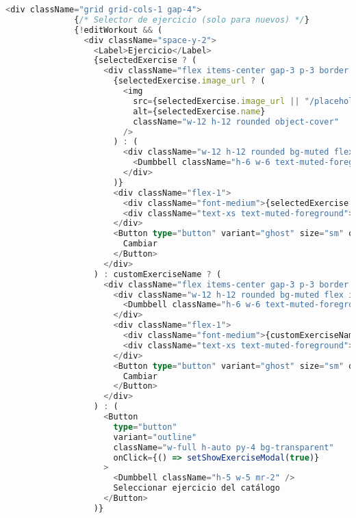 \documentclass[12pt,a4paper]{article}
\begin{document}
\begin{lstlisting}[language=typescript, caption=components/gym/workout-form.tsx - Estructura principal]
            <div className="grid grid-cols-1 gap-4">
              {/* Selector de ejercicio (solo para nuevos) */}
              {!editWorkout && (
                <div className="space-y-2">
                  <Label>Ejercicio</Label>
                  {selectedExercise ? (
                    <div className="flex items-center gap-3 p-3 border rounded-lg bg-accent/50">
                      {selectedExercise.image_url ? (
                        <img
                          src={selectedExercise.image_url || "/placeholder.svg"}
                          alt={selectedExercise.name}
                          className="w-12 h-12 rounded object-cover"
                        />
                      ) : (
                        <div className="w-12 h-12 rounded bg-muted flex items-center justify-center">
                          <Dumbbell className="h-6 w-6 text-muted-foreground" />
                        </div>
                      )}
                      <div className="flex-1">
                        <div className="font-medium">{selectedExercise.name}</div>
                        <div className="text-xs text-muted-foreground">{selectedExercise.category}</div>
                      </div>
                      <Button type="button" variant="ghost" size="sm" onClick={() => setShowExerciseModal(true)}>
                        Cambiar
                      </Button>
                    </div>
                  ) : customExerciseName ? (
                    <div className="flex items-center gap-3 p-3 border rounded-lg bg-accent/50">
                      <div className="w-12 h-12 rounded bg-muted flex items-center justify-center">
                        <Dumbbell className="h-6 w-6 text-muted-foreground" />
                      </div>
                      <div className="flex-1">
                        <div className="font-medium">{customExerciseName}</div>
                        <div className="text-xs text-muted-foreground">Ejercicio personalizado</div>
                      </div>
                      <Button type="button" variant="ghost" size="sm" onClick={() => setShowExerciseModal(true)}>
                        Cambiar
                      </Button>
                    </div>
                  ) : (
                    <Button
                      type="button"
                      variant="outline"
                      className="w-full h-auto py-4 bg-transparent"
                      onClick={() => setShowExerciseModal(true)}
                    >
                      <Dumbbell className="h-5 w-5 mr-2" />
                      Seleccionar ejercicio del catálogo
                    </Button>
                  )}


\end{lstlisting}
\end{document}
